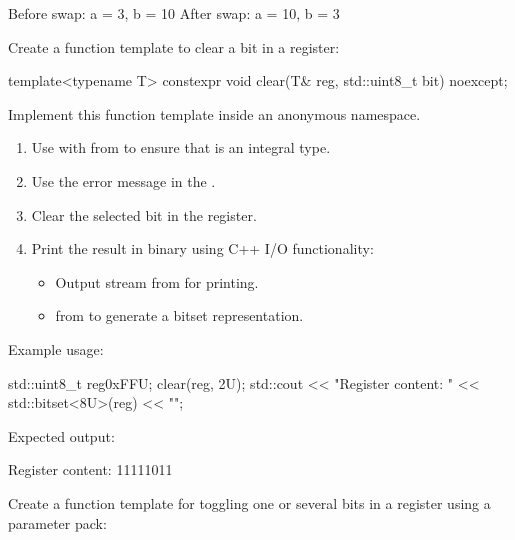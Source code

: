 \begin{console}
Before swap: a = 3, b = 10
After swap: a = 10, b = 3
\end{console}

\label{c1:set:4}

\label{c1:ex:4.1}
Create a function template to clear a bit in a register:

\begin{cppcode}
template<typename T>
constexpr void clear(T& reg, std::uint8_t bit) noexcept;
\end{cppcode}

\noindent Implement this function template inside an anonymous namespace.

\begin{enumerate}
  \item Use  with  from
     to ensure that  is an integral type.
  \item Use the error message  in the
    .
  \item Clear the selected bit in the register.
  \item Print the result in binary using C++ I/O functionality:
  \begin{itemize}
    \item Output stream  from  for printing.
    \item {} from  to generate a bitset representation.
  \end{itemize}
\end{enumerate}
Example usage:

\begin{cppcode}
std::uint8_t reg{0xFFU};
clear(reg, 2U);
std::cout << "Register content: " << std::bitset<8U>(reg) << "\n";
\end{cppcode}

\noindent Expected output:

\begin{console}
Register content: 11111011
\end{console}

\label{c1:ex:4.2}
Create a function template for toggling one or several bits in a register using a parameter pack:


